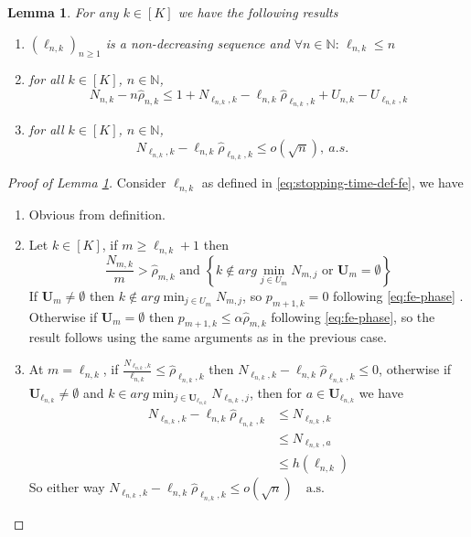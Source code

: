 \documentclass[11pt]{article}
\theoremstyle{plain}
\newtheorem{lemma}[theorem]{Lemma}
\theoremstyle{definition}
\begin{document}
\begin{appendix}
\begin{lemma}\label{lem:preliminary2}
	For any \(k \in [K]\) we have the following results
	\begin{enumerate}[label=(\roman*)]
		\item \(\left(\ell_{n,k}\right)_{n \geq 1}\) is a non-decreasing sequence and \(\forall n \in \mathbb{N}: \,\ell_{n,k} \leq n\)
		\item for all $k\in [K]$, $n \in \mathbb{N}$,\begin{equation}\label{eq:prelim-4}
			N_{n,k} - n\hat{\rho}_{n,k} \leq 1+N_{\ell_{n,k},k} - \ell_{n,k} \hat{\rho}_{\ell_{n,k},k} + U_{n,k} - U_{\ell_{n,k},k}
		\end{equation}
		\item for all $k\in [K]$, $n \in \mathbb{N}$,
		\begin{equation}\label{eq:condition}
			N_{\ell_{n,k},k} - \ell_{n,k} \hat{\rho}_{\ell_{n,k},k} \leq o(\sqrt{n}), \ a.s.
			\quad
		\end{equation}
	\end{enumerate}
\end{lemma}

\begin{proof}[Proof of Lemma \ref{lem:preliminary2}]
	Consider \(\ell_{n,k}\) as defined in \eqref{eq:stopping-time-def-fe}, we have
	\begin{enumerate}[label=(\roman*)]
		\item Obvious from definition.
		\item Let \(k \in [K]\), if \(m \geq \ell_{n,k} + 1\) then
		\[
		\frac{N_{m,k}}{m} > \hat{\rho}_{m,k} \text{ and } \left\{k \notin arg\!\min_{j \in U_m} N_{m,j}\text{ or } \mathbf{U}_m = \emptyset\right\}
		\]
		If \(\mathbf{U}_m \neq \emptyset\) then \(k \notin arg\!\min_{j \in U_m} N_{m,j}\), so \(p_{m+1,k} = 0\) following \eqref{eq:fe-phase} . Otherwise if \(\mathbf{U}_m = \emptyset\) then \(p_{m+1,k} \leq \alpha \hat{\rho}_{m,k}\) following \eqref{eq:fe-phase}, so the result follows using the same arguments as in the previous case.
		\item At \(m = \ell_{n,k}\), if \(\frac{N_{\ell_{n,k},k}}{\ell_{n,k}} \leq \hat{\rho}_{\ell_{n,k},k}\) then \(	N_{\ell_{n,k},k} - \ell_{n,k} \hat{\rho}_{\ell_{n,k},k} \leq 0
		\),
		otherwise if \(\mathbf{U}_{\ell_{n,k}} \neq \emptyset\) and \(k \in arg\!\min_{j \in \mathbf{U}_{\ell_{n,k}}} N_{\ell_{n,k},j}\), then for \(a \in \mathbf{U}_{\ell_{n,k}}\) we have
		\begin{align*}
			N_{\ell_{n,k},k} - \ell_{n,k} \hat{\rho}_{\ell_{n,k},k}
			&\leq N_{\ell_{n,k},k}\\
			&\leq N_{\ell_{n,k},a}\\
			&\leq h(\ell_{n,k})
		\end{align*}
		So either way \(N_{\ell_{n,k},k} - \ell_{n,k} \hat{\rho}_{\ell_{n,k},k} \leq o(\sqrt{n}) \quad \text{a.s.}\)
	\end{enumerate}
\end{proof}


\end{appendix}
\end{document}
